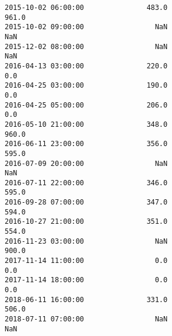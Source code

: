 \documentclass[11pt]{article}
\begin{document}
\begin{tcolorbox}[breakable, size=fbox, boxrule=.5pt, pad at break*=1mm, opacityfill=0]
\begin{Verbatim}[commandchars=\\\{\}]
2015-10-02 06:00:00               483.0                                 961.0
2015-10-02 09:00:00                 NaN                                   NaN
2015-12-02 08:00:00                 NaN                                   NaN
2016-04-13 03:00:00               220.0                                   0.0
2016-04-25 03:00:00               190.0                                   0.0
2016-04-25 05:00:00               206.0                                   0.0
2016-05-10 21:00:00               348.0                                 960.0
2016-06-11 23:00:00               356.0                                 595.0
2016-07-09 20:00:00                 NaN                                   NaN
2016-07-11 22:00:00               346.0                                 595.0
2016-09-28 07:00:00               347.0                                 594.0
2016-10-27 21:00:00               351.0                                 554.0
2016-11-23 03:00:00                 NaN                                 900.0
2017-11-14 11:00:00                 0.0                                   0.0
2017-11-14 18:00:00                 0.0                                   0.0
2018-06-11 16:00:00               331.0                                 506.0
2018-07-11 07:00:00                 NaN                                   NaN


\end{Verbatim}
\end{tcolorbox}
\end{document}
